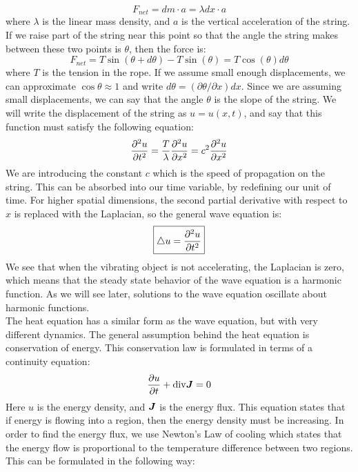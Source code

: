 \documentclass{article}
\begin{document}
\begin{equation}
    F_{net}=dm\cdot a=\lambda dx \cdot a
\end{equation}
where $\lambda$ is the linear mass density, and $a$ is the vertical acceleration of the string. If we raise part of the string near this point so that the angle the string makes between these two points is $\theta$, then the force is:
\begin{equation}
    F_{net}=T \sin(\theta + d\theta)-T \sin(\theta)=T\cos(\theta)d\theta
\end{equation}
where $T$ is the tension in the rope. If we assume small enough displacements, we can approximate $\cos\theta\approx 1$ and write $d\theta= (\partial\theta/\partial x) dx$. Since we are assuming small displacements, we can say that the angle $\theta$ is the slope of the string. We will write the displacement of the string as $u=u(x,t)$, and say that this function must satisfy the following equation:
\begin{equation}\frac{\partial ^2 u}{\partial t^2}= \frac{T}{\lambda}\frac{\partial ^2 u}{\partial x^2}=c^2 \frac{\partial ^2 u}{\partial x^2}\end{equation}
We are introducing the constant $c$ which is the speed of propagation on the string. This can be absorbed into our time variable, by redefining our unit of time. For higher spatial dimensions, the second partial derivative with respect to $x$ is replaced with the Laplacian, so the general wave equation is:
\begin{equation}
  \boxed{
    \bigtriangleup u =\frac{\partial ^2 u}{\partial t^2}
  }
\end{equation}
We see that when the vibrating object is not accelerating, the Laplacian is zero, which means that the steady state behavior of the wave equation is a harmonic function. As we will see later, solutions to the wave equation oscillate about harmonic functions.\\
The heat equation has a similar form as the wave equation, but with very different dynamics. The general assumption behind the heat equation is conservation of energy. This conservation law is formulated in terms of a continuity equation:
\begin{equation}
  \frac{\partial u}{\partial t}+\mathrm{div} \bm{J}=0
\end{equation}
Here $u$ is the energy density, and $\bm{J}$ is the energy flux. This equation states that if energy is flowing into a region, then the energy density must be increasing. In order to find the energy flux, we use Newton's Law of cooling which states that the energy flow is proportional to the temperature difference between two regions. This can be formulated in the following way:
\end{document}
